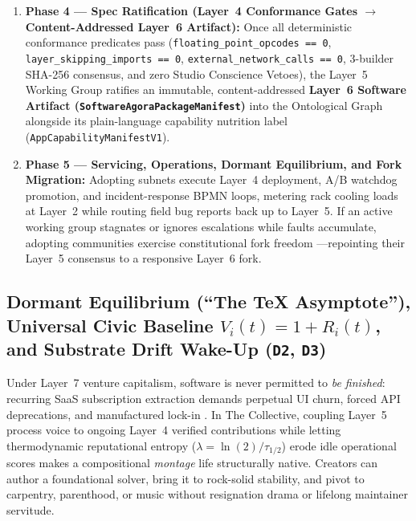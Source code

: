 \begin{enumerate}
    (\texttt{col-kmsd}) mints domain Proof of Stewardship ($\Delta R_{i,\mathrm{bp}}$) upon verified milestone completion.
    \item \textbf{Phase 4 --- Spec Ratification (Layer~4 Conformance Gates $\to$ Content-Addressed Layer~6 Artifact):}
    Once all deterministic conformance predicates pass (\texttt{floating\_point\_opcodes == 0},
    \texttt{layer\_skipping\_imports == 0}, \texttt{external\_network\_calls == 0}, 3-builder SHA-256 consensus, and
    zero Studio Conscience Vetoes), the Layer~5 Working Group ratifies an immutable, content-addressed \textbf{Layer~6
    Software Artifact (\texttt{SoftwareAgoraPackageManifest})} into the Ontological Graph alongside its plain-language
    capability nutrition label (\texttt{AppCapabilityManifestV1}).
    \item \textbf{Phase 5 --- Servicing, Operations, Dormant Equilibrium, and Fork Migration:} Adopting subnets execute
    Layer~4 deployment, A/B watchdog promotion, and incident-response BPMN loops, metering rack cooling loads at
    Layer~2 while routing field bug reports back up to Layer~5. If an active working group stagnates or ignores
    escalations while faults accumulate, adopting communities exercise constitutional fork freedom
    \parencite{hirschman1970}---repointing their Layer~5 consensus to a responsive Layer~6 fork.
\end{enumerate}

\subsection{Dormant Equilibrium (``The \TeX{} Asymptote''), Universal Civic Baseline $V_i(t) = 1 + R_i(t)$, and Substrate Drift Wake-Up (\texttt{D2}, \texttt{D3})}
\label{sec:zero-tex-asymptote}

Under Layer~7 venture capitalism, software is never permitted to \emph{be finished}: recurring SaaS subscription
extraction demands perpetual UI churn, forced API deprecations, and manufactured lock-in \parencite{zuboff2019,illich1973}.
In The Collective, coupling Layer~5 process voice to ongoing Layer~4 verified contributions while letting thermodynamic
reputational entropy ($\lambda = \ln(2)/\tau_{1/2}$) erode idle operational scores makes a compositional
\emph{montage} life structurally native. Creators can author a foundational solver, bring it to rock-solid stability,
and pivot to carpentry, parenthood, or music without resignation drama or lifelong maintainer servitude.


